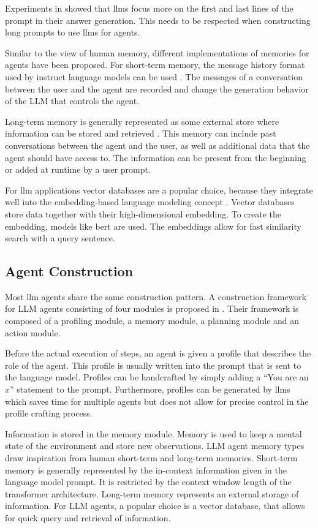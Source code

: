 \documentclass[../main.tex]{subfiles}
\begin{document}
Experiments in \cite{Liu2023} showed
that \glspl{llm} focus more on the first and last lines of the prompt
in their answer generation.
This needs to be respected when constructing long prompts to use \glspl{llm} for agents.

Similar to the view of human memory,
different implementations of memories for agents have been proposed.
For short-term memory,
the message history format used by instruct language models can be used \cite{Hatalis2023}.
The messages of a conversation between the user and the agent
are recorded and change the generation behavior of the LLM that controls the agent.

Long-term memory is generally represented as some external store
where information can be stored and retrieved \cite{Hatalis2023}.
This memory can include past conversations between the agent and the user,
as well as additional data that the agent should have access to.
The information can be present from the beginning or added at runtime by a user prompt.

For \gls{llm} applications vector databases are a popular choice,
because they integrate well into the embedding-based language modeling concept \cite{Han2023}.
Vector databases store data together with their high-dimensional embedding.
To create the embedding, models like \gls{bert} are used.
The embeddings allow for fast similarity search with a query sentence.

\subsection{Agent Construction}

Most \gls{llm} agents share the same construction pattern.
A construction framework for LLM agents consisting of four modules
is proposed in \cite{Wang2023}.
Their framework is composed of a profiling module, a memory module,
a planning module and an action module.

Before the actual execution of steps, an agent is given a profile that describes
the role of the agent.
This profile is usually written into the prompt that is sent to the language model.
Profiles can be handcrafted by simply adding a ``You are an $x$'' statement to the prompt.
Furthermore, profiles can be generated by \glspl{llm} which saves time for multiple agents
but does not allow for precise control in the profile crafting process.

Information is stored in the memory module.
Memory is used to keep a mental state of the environment and store new observations.
LLM agent memory types draw inspiration from human short-term and long-term memories.
Short-term memory is generally represented by the in-context information given in the language model prompt.
It is restricted by the context window length of the transformer architecture.
Long-term memory represents an external storage of information.
For LLM agents, a popular choice is a vector database,
that allows for quick query and retrieval of information.
\end{document}
